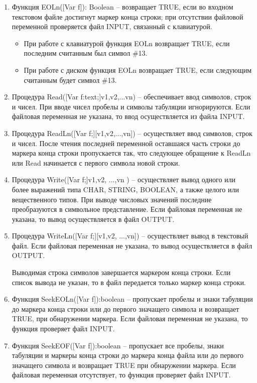 \begin{enumerate}
\item Функция EOLn([Var  f]): Boolean – возвращает TRUE, если во входном текстовом файле достигнут маркер конца строки; при отсутствии файловой переменной проверяется файл INPUT, связанный с клавиатурой.

\begin{itemize}
\item При работе с клавиатурой функция EOLn возвращает TRUE, если последним считанным был символ \#13. 
\item При работе с диском функция EOLn возвращает TRUE, если следующим считанным будет символ \#13.
\end{itemize}

\item Процедура Read([Var f:text;]v1,v2,...vn) – обеспечивает ввод символов, строк и чисел. При вводе чисел пробелы и символы табуляции игнорируются. Если файловая переменная не указана, то ввод осуществляется из файла INPUT.

\item Процедура ReadLn([Var f;][v1,v2,...,vn]) – осуществляет ввод символов, строк и чисел. После чтения последней переменной оставшаяся часть строки до маркера конца строки пропускается так, что следующее обращение к ReadLn или Read начинается с первого символа новой строки. 

\item Процедура Write([Var  f;]v1,v2, ...,vn ) – осуществляет вывод одного или более выражений типа CHAR, STRING, BOOLEAN, а также целого или вещественного типов. При выводе числовых значений последние преобразуются в символьное представление. Если файловая переменная не указана, то вывод осуществляется в файл OUTPUT.
    
\item Процедура WriteLn([Var f;][v1,v2, ...,vn]) – осуществляет вывод в текстовый файл. Если файловая переменная не указана, то вывод осуществляется в файл OUTPUT.

Выводимая строка символов завершается маркером конца строки. Если список вывода не указан, то в файл передается только маркер конца строки.
     
\item Функция SeekEOLn([Var f]):boolean – пропускает пробелы и знаки табуляции до маркера конца строки или до первого значащего символа и возвращает TRUE, при обнаружении маркера. Если файловая переменная не указана, то функция проверяет файл INPUT.

\item Функция SeekEOF([Var f]):boolean – пропускает все пробелы, знаки табуляции и маркеры конца строки до маркера конца файла или до первого значащего символа и возвращает TRUE при обнаружении маркера. Если файловая переменная отсутствует, то функция проверяет файл INPUT.
\end{enumerate}

